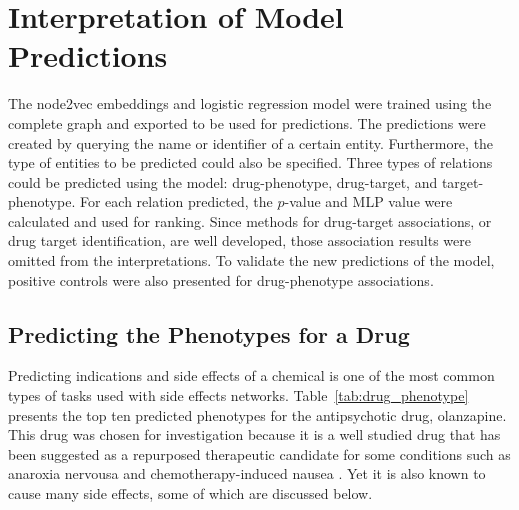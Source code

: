 \section{Interpretation of Model Predictions}

The node2vec embeddings and logistic regression model were trained using the complete graph and exported to be used for predictions.
The predictions were created by querying the name or identifier of a certain entity.
Furthermore, the type of entities to be predicted could also be specified.
Three types of relations could be predicted using the model: drug-phenotype, drug-target, and target-phenotype.
For each relation predicted, the $p$-value and \ac{MLP} value were calculated and used for ranking.
Since methods for drug-target associations, or drug target identification, are well developed, those association results were omitted from the interpretations.
To validate the new predictions of the model, positive controls were also presented for drug-phenotype associations.

\subsection{Predicting the Phenotypes for a Drug}

Predicting indications and side effects of a chemical is one of the most common types of tasks used with side effects networks.
Table~\ref{tab:drug_phenotype} presents the top ten predicted phenotypes for the antipsychotic drug, olanzapine. 
This drug was chosen for investigation because it is a well studied drug that has been suggested as a repurposed therapeutic candidate for some conditions such as anaroxia nervousa \cite{himmerich_olanzapine_2017} and chemotherapy-induced nausea \cite{flank_olanzapine_2018}. 
Yet it is also known to cause many side effects, some of which are discussed below.

